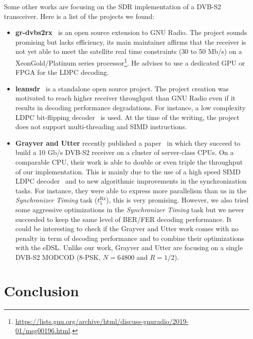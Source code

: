 Some other works are focusing on the SDR implementation of a DVB-S2 transceiver.
Here is a list of the projects we found:
\begin{itemize}
  \item \textbf{gr-dvbs2rx}~\cite{gr-dvbs2rx} is an open source extension to GNU
    Radio. The project sounds promising but lacks efficiency, its main
    maintainer affirms that the receiver is not yet able to meet the satellite
    real time constraints (30 to 50 Mb/s) on a Xeon\TM Gold/Platinum series
    processor\footnote{\url{https://lists.gnu.org/archive/html/discuss-gnuradio/2019-01/msg00196.html}.}.
    He advises to use a dedicated GPU or FPGA for the LDPC decoding.
  \item \textbf{leansdr}~\cite{leansdr} is a standalone open source project. The
    project creation was motivated to reach higher receiver throughput than GNU
    Radio even if it results in decoding performance degradations. For instance,
    a low complexity LDPC bit-flipping decoder~\cite{Ryan2009} is used. At the
    time of the writing, the project does not support multi-threading and SIMD
    instructions.
  \item \textbf{Grayver and Utter} recently published a paper~\cite{Grayver2020}
    in which they succeed to build a 10 Gb/s DVB-S2 receiver on a cluster of
    server-class CPUs. On a comparable CPU, their work is able to double or even
    triple the throughput of our implementation. This is mainly due to the use
    of a high speed SIMD LDPC decoder~\cite{LeGal2016,Grayver2019} and to new
    algorithmic improvements in the synchronization tasks. For instance, they
    were able to express more parallelism than us in the \emph{Synchronizer
    Timing} task ($t^\text{Rx}_{5}$), this is very promising. However, we also
    tried some aggressive optimizations in the \emph{Synchronizer Timing} task
    but we never succeeded to keep the same level of BER/FER decoding
    performance. It could be interesting to check if the Grayver and Utter work
    comes with no penalty in term of decoding performance and to combine their
    optimizations with the \AFFECT eDSL. Unlike our work, Grayver and Utter are
    focusing on a single DVB-S2 MODCOD (8-PSK, $N = 64800$ and $R = 1/2$).
\end{itemize}

\section{Conclusion}


